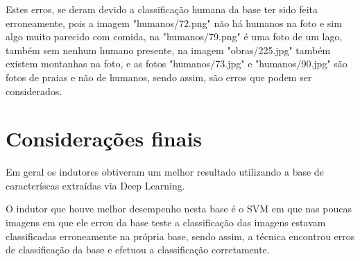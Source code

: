 \documentclass[
article,			%
11pt,				%
oneside,			%
a4paper,			%
english,			%
brazil,				%
sumario=tradicional,
]{abntex2}
\begin{document}
	Estes erros, se deram devido a classificação humana da base ter sido feita erroneamente, pois a imagem "humanos/72.png" não há humanos na foto e sim algo muito parecido com comida, na "humanos/79.png" é uma foto de um lago, também sem nenhum humano presente, na imagem "obras/225.jpg" também existem montanhas na foto, e as fotos "humanos/73.jpg" e "humanos/90.jpg"  são fotos de praias e não de humanos, sendo assim, são erros que podem ser considerados.
	
	\section{Considerações finais}
	
	Em geral os indutores obtiveram um melhor resultado utilizando a base de caracteríscas extraídas via Deep Learning.
	
	O indutor que houve melhor desempenho nesta base é o SVM em que nas poucas imagens em que ele errou da base teste a classificação das imagens estavam classificadas erroneamente na própria base, sendo assim, a técnica encontrou erros de classificação da base e efetuou a classificação corretamente. 
	
	\postextual
	
	
	
	
	
		
		
\end{document}
